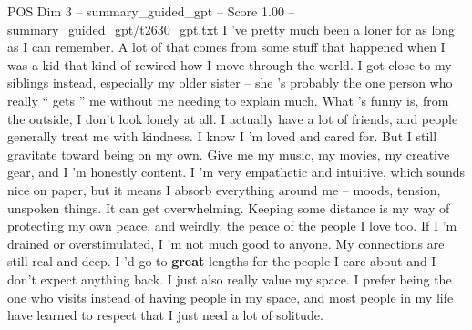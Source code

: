 \begin{textsample}{POS Dim 3 – summary\_guided\_gpt – Score 1.00 – summary\_guided\_gpt/t2630\_gpt.txt}  \label{ex:f3_pos_026}
I ’ve pretty much been a loner for as long as I can remember.
A lot of that comes from some stuff that happened when I was a kid that kind of rewired how I move through the world.
I got close to my siblings instead, especially my older sister – she ’s probably the one person who really “ gets ” me without me needing to explain much.
What ’s funny is, from the outside, I don't look lonely at all.
I actually have a lot of friends, and people generally treat me with kindness.
I know I ’m loved and cared for.
But I still gravitate toward being on my own.
Give me my music, my movies, my creative gear, and I ’m honestly content.
I ’m very empathetic and intuitive, which sounds nice on paper, but it means I absorb everything around me – moods, tension, unspoken things.
It can get overwhelming.
Keeping some distance is my way of protecting my own peace, and weirdly, the peace of the people I love too.
If I ’m drained or overstimulated, I ’m not much good to anyone.
My connections are still real and deep.
I ’d go to \textbf{great} lengths for the people I care about and I don't expect anything back.
I just also really value my space.
I prefer being the one who visits instead of having people in my space, and most people in my life have learned to respect that I just need a lot of solitude.

\end{textsample}
